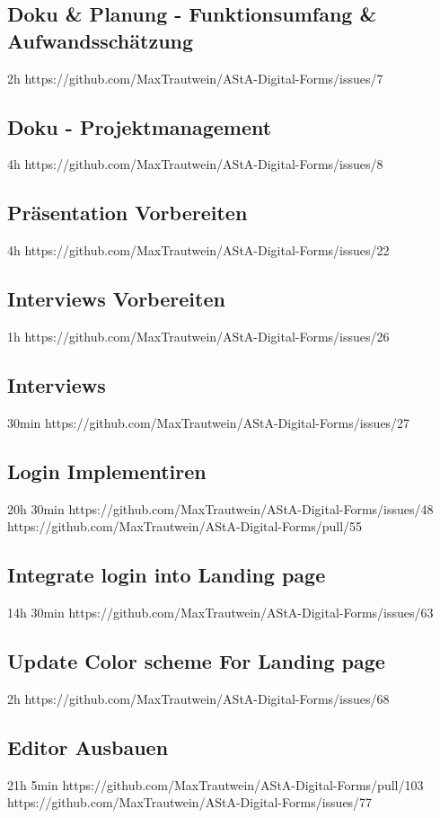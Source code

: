 \subsection{Doku & Planung - Funktionsumfang & Aufwandsschätzung}
2h
https://github.com/MaxTrautwein/AStA-Digital-Forms/issues/7

\subsection{Doku - Projektmanagement}
4h
https://github.com/MaxTrautwein/AStA-Digital-Forms/issues/8


\subsection{Präsentation Vorbereiten}
4h
https://github.com/MaxTrautwein/AStA-Digital-Forms/issues/22
\subsection{Interviews Vorbereiten}
1h
https://github.com/MaxTrautwein/AStA-Digital-Forms/issues/26
\subsection{Interviews}
30min
https://github.com/MaxTrautwein/AStA-Digital-Forms/issues/27
\subsection{Login Implementiren}
20h 30min
https://github.com/MaxTrautwein/AStA-Digital-Forms/issues/48
https://github.com/MaxTrautwein/AStA-Digital-Forms/pull/55
\subsection{Integrate login into Landing page}
14h 30min
https://github.com/MaxTrautwein/AStA-Digital-Forms/issues/63
\subsection{Update Color scheme For Landing page}
2h
https://github.com/MaxTrautwein/AStA-Digital-Forms/issues/68
\subsection{Editor Ausbauen}
21h 5min
https://github.com/MaxTrautwein/AStA-Digital-Forms/pull/103
https://github.com/MaxTrautwein/AStA-Digital-Forms/issues/77
